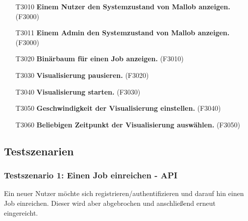 \begin{itemize}
    \item[T3010] \textbf{Einem Nutzer den Systemzustand von Mallob anzeigen.} (F3000)
    
    \item[T3011] \textbf{Einem Admin den Systemzustand von Mallob anzeigen.} (F3000)
    
    \item[T3020] \textbf{Binärbaum für einen Job anzeigen.} (F3010)
    
    \item[T3030] \textbf{Visualisierung pausieren.} (F3020)
    
    \item[T3040] \textbf{Visualisierung starten.} (F3030)
    
    \item[T3050] \textbf{Geschwindigkeit der Visualisierung einstellen.} (F3040)
    
    \item[T3060] \textbf{Beliebigen Zeitpunkt der Visualisierung auswählen.} (F3050)
    
\end{itemize}


\subsection{Testszenarien}

\subsubsection{Testszenario 1: Einen Job einreichen - API}
Ein neuer Nutzer möchte sich registrieren/authentifizieren und darauf hin einen Job einreichen. Dieser wird aber abgebrochen und anschließend erneut eingereicht. 

